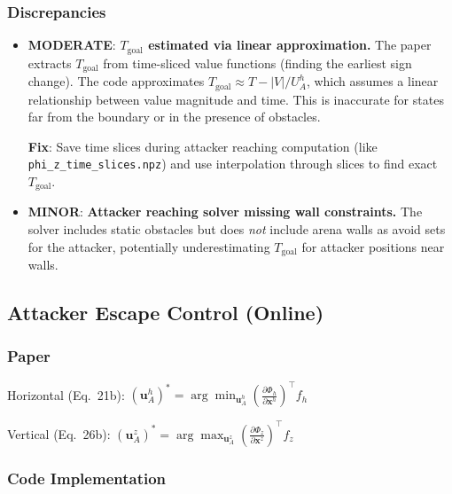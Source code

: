 \documentclass[11pt,a4paper]{article}
\begin{document}
\subsubsection{Discrepancies}

\begin{itemize}
\item \textcolor{modoran}{\textbf{MODERATE}}: \textbf{$T_{\mathrm{goal}}$ estimated via linear approximation.} The paper extracts $T_{\mathrm{goal}}$ from time-sliced value functions (finding the earliest sign change). The code approximates $T_{\mathrm{goal}} \approx T - |V|/U^h_A$, which assumes a linear relationship between value magnitude and time. This is inaccurate for states far from the boundary or in the presence of obstacles.

\textbf{Fix}: Save time slices during attacker reaching computation (like \texttt{phi\_z\_time\_slices.npz}) and use interpolation through slices to find exact $T_{\mathrm{goal}}$.

\item \textcolor{minblue}{\textbf{MINOR}}: \textbf{Attacker reaching solver missing wall constraints.} The solver includes static obstacles but does \emph{not} include arena walls as avoid sets for the attacker, potentially underestimating $T_{\mathrm{goal}}$ for attacker positions near walls.
\end{itemize}

\subsection{Attacker Escape Control (Online)}

\subsubsection{Paper}

Horizontal (Eq.~21b): $(\mathbf{u}^h_A)^* = \arg\min_{\mathbf{u}^h_A} \left(\frac{\partial\Phi_h}{\partial\mathbf{x}^h}\right)^\top f_h$

Vertical (Eq.~26b): $(\mathbf{u}^z_A)^* = \arg\max_{\mathbf{u}^z_A} \left(\frac{\partial\Phi_z}{\partial\mathbf{x}^z}\right)^\top f_z$

\subsubsection{Code Implementation}
\end{document}
